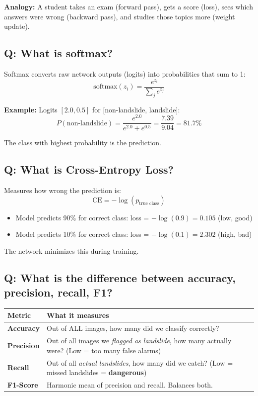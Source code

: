 \documentclass[11pt]{article}
\begin{document}
\textbf{Analogy:} A student takes an exam (forward pass), gets a score (loss), sees which answers were wrong (backward pass), and studies those topics more (weight update).

\subsection{Q: What is softmax?}

Softmax converts raw network outputs (logits) into probabilities that sum to 1:
\[
\text{softmax}(z_i) = \frac{e^{z_i}}{\sum_j e^{z_j}}
\]

\textbf{Example:} Logits $[2.0, 0.5]$ for [non-landslide, landslide]:
\[
P(\text{non-landslide}) = \frac{e^{2.0}}{e^{2.0} + e^{0.5}} = \frac{7.39}{9.04} = 81.7\%
\]

The class with highest probability is the prediction.

\subsection{Q: What is Cross-Entropy Loss?}

Measures how wrong the prediction is:
\[
\text{CE} = -\log(p_{\text{true class}})
\]

\begin{itemize}[noitemsep]
    \item Model predicts 90\% for correct class: loss = $-\log(0.9) = 0.105$ (low, good)
    \item Model predicts 10\% for correct class: loss = $-\log(0.1) = 2.302$ (high, bad)
\end{itemize}

The network minimizes this during training.

\subsection{Q: What is the difference between accuracy, precision, recall, F1?}

\begin{table}[H]
    \centering
    \renewcommand{\arraystretch}{1.3}
    \begin{tabular}{lp{10cm}}
        \toprule
        \textbf{Metric} & \textbf{What it measures} \\
        \midrule
        \textbf{Accuracy} & Out of ALL images, how many did we classify correctly? \\
        \textbf{Precision} & Out of all images we \textit{flagged as landslide}, how many actually were? (Low = too many false alarms) \\
        \textbf{Recall} & Out of all \textit{actual landslides}, how many did we catch? (Low = missed landslides = \textbf{dangerous}) \\
        \textbf{F1-Score} & Harmonic mean of precision and recall. Balances both. \\
        \bottomrule
    \end{tabular}
\end{table}
\end{document}
